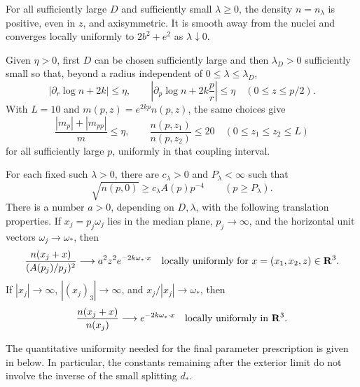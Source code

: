 \begin{proposition}
\label{prop:density-properties}
For all sufficiently large \(D\) and sufficiently small \(\lambda\geq0\),
the density \(n=n_\lambda\) is positive, even in \(z\), and axisymmetric.
It is smooth away from the nuclei and converges locally uniformly to
\(2b^2+e^2\) as \(\lambda\downarrow0\).

Given \(\eta>0\), first \(D\) can be chosen sufficiently large and then
\(\lambda_D>0\) sufficiently small so that, beyond a radius independent
of \(0\leq\lambda\leq\lambda_D\),
\begin{equation}
 |\partial_r\log n+2k|\leq\eta,\qquad
 \left|\partial_p\log n+2k\frac p r\right|\leq\eta
 \quad(0\leq z\leq p/2).
 \label{eq:density-drift}
\end{equation}
With \(L=10\) and \(m(p,z)=e^{2kp}n(p,z)\), the same choices give
\begin{equation}
 \frac{|m_p|+|m_{pp}|}{m}\leq\eta,\qquad
 \frac{n(p,z_1)}{n(p,z_2)}\leq20
 \quad(0\leq z_1\leq z_2\leq L)
 \label{eq:strip-data}
\end{equation}
for all sufficiently large \(p\), uniformly in that coupling interval.

For each fixed such \(\lambda>0\), there are \(c_\lambda>0\) and
\(P_\lambda<\infty\) such that
\begin{equation}
 \sqrt{n(p,0)}\geq c_\lambda A(p)p^{-4}\qquad(p\geq P_\lambda).
 \label{eq:plane-tail}
\end{equation}
There is a number \(a>0\), depending on \(D,\lambda\), with the following
translation properties.  If \(x_j=p_j\omega_j\) lies in the median plane,
\(p_j\to\infty\), and the horizontal unit vectors \(\omega_j\to\omega_*\),
then
\begin{equation}
 \frac{n(x_j+x)}{(A(p_j)/p_j)^2}
 \longrightarrow a^2z^2e^{-2k\omega_*\cdot x}
 \quad\hbox{locally uniformly for }x=(x_1,x_2,z)\in\mathbf R^3.
 \label{eq:plane-translate}
\end{equation}
If \(|x_j|\to\infty\), \(|(x_j)_3|\to\infty\), and
\(x_j/|x_j|\to\omega_*\), then
\begin{equation}
 \frac{n(x_j+x)}{n(x_j)}
 \longrightarrow e^{-2k\omega_*\cdot x}
 \quad\hbox{locally uniformly in }\mathbf R^3.
 \label{eq:bulk-translate}
\end{equation}
\end{proposition}

The quantitative uniformity needed for the final parameter prescription
is given in  below.  In particular,
the constants remaining after the exterior limit do not involve the
inverse of the small splitting \(d_*\).

